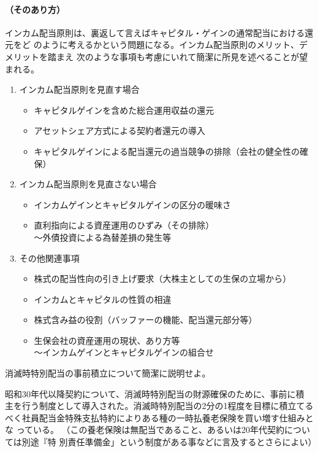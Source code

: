 \documentclass[report,gutter=10mm,fore-edge=10mm,uplatex,dvipdfmx]{jlreq}
\begin{document}
\paragraph{（そのあり方）}
インカム配当原則は、裏返して言えばキャピタル・ゲインの通常配当における還元をど
のように考えるかという問題になる。インカム配当原則のメリット、デメリットを踏まえ
次のような事項も考慮にいれて簡潔に所見を述べることが望まれる。
\begin{enumerate} [◯]
\item インカム配当原則を見直す場合
\begin{itemize}
 \item キャピタルゲインを含めた総合運用収益の還元
\item アセットシェア方式による契約者還元の導入
\item キャピタルゲインによる配当還元の過当競争の排除（会社の健全性の確保）
\end{itemize}
\item インカム配当原則を見直さない場合
\begin{itemize}
 \item インカムゲインとキャピタルゲインの区分の暖味さ
 \item 直利指向による資産運用のひずみ（その排除）\\
 〜外債投資による為替差損の発生等
\end{itemize}
\item その他関連事項
\begin{itemize}
 \item 株式の配当性向の引き上げ要求（大株主としての生保の立場から）
 \item インカムとキャピタルの性質の相違
 \item 株式含み益の役割（バッファーの機能、配当還元部分等）
 \item 生保会社の資産運用の現状、あり方等\\
 〜インカムゲインとキャピタルゲインの組合せ
\end{itemize}
\end{enumerate}

消滅時特別配当の事前積立について簡潔に説明せよ。

昭和30年代以降契約について、消滅時特別配当の財源確保のために、事前に積
主を行う制度として導入された。消滅時特別配当の2分の1程度を目標に積立てる
べく社員配当金特殊支払特約によりある種の一時払養老保険を買い増す仕組みとな
っている。
（この養老保険は無配当であること、あるいは20年代契約については別途『特
別責任準備金」という制度がある事などに言及するとさらによい）
\end{document}
